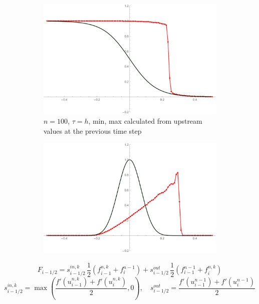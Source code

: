 \documentclass{article}
\begin{document}
\begin{figure}[h!]
	\begin{subfigure}{.5\textwidth}
		\centering
		\includegraphics[width=\textwidth]{shock}
		\caption{$ n = 100 $, $ \tau = h $, min, max calculated from upstream values at the previous time step}
	\end{subfigure}
	\begin{subfigure}{.5\textwidth}
		\centering
		\includegraphics[width=\textwidth]{triang}
	\end{subfigure}
\end{figure}

\[
F_{i-1/2} = s_{i-1/2}^{in, k} \, \dfrac{1}{2}\left(f^{n,k}_{i-1} + f^{n-1}_{i}\right) + s_{i-1/2}^{out} \, \dfrac{1}{2}\left(f^{n-1}_{i-1} + f^{n,k}_{i}\right)
\]
\[
s_{i-1/2}^{in, k} = \max\left(\frac{f'(u_{i-1}^{n,k}) + f'(u_{i}^{n,k})}{2}, 0\right), \quad s_{i-1/2}^{out} = \frac{f'(u_{i-1}^{n-1}) + f'(u_{i}^{n-1})}{2}
\]
\end{document}
